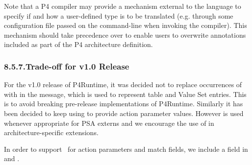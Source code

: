 \documentclass[11pt]{article}
\begin{document}
{%
\noindent{}Note that a P4 compiler may provide a mechanism external to the language to
specify if and how a user-defined type is to be translated (e.g. through some
configuration file passed on the command-line when invoking the compiler). This
mechanism should take precedence over  to enable users
to overwrite annotations included as part of the P4 architecture definition.%

\subsubsection{8.5.7.\hspace*{0.5em}Trade-off for v1.0 Release}\label{sec-trade-off-for-v10-release}%

\noindent{}For the v1.0 release of P4Runtime, it was decided not to replace occurrences of
 with  in the  message, which is used to
represent table and Value Set entries. This is to avoid breaking pre-release
implementations of P4Runtime. Similarly it has been decided to keep using
 to provide action parameter values. However  is used whenever
appropriate for PSA externs and we encourage the use of  in
architecture-specific extensions.%

In order to support~ for action
parameters and match fields, we include a  field in
 and .%

}
\end{document}
